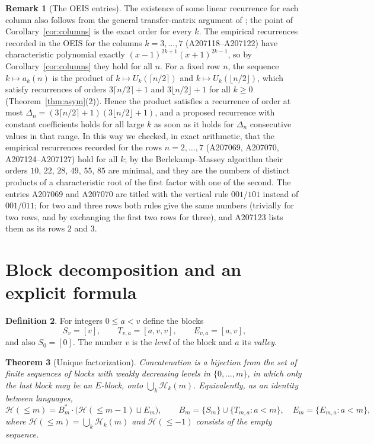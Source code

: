 \documentclass[11pt]{amsart}
\newtheorem{theorem}{Theorem}[section]
\theoremstyle{definition}
\newtheorem{definition}[theorem]{Definition}
\newtheorem{remark}[theorem]{Remark}
\begin{document}
\begin{remark}[The OEIS entries]\label{rem:oeis}
The existence of some linear recurrence for each column also follows from the general transfer-matrix argument of \cite[Theorem~2]{DBKTZ}; the point of Corollary~\ref{cor:columns} is the exact order for every $k$. The empirical recurrences recorded in the OEIS for the columns $k=3,\dots,7$ (A207118--A207122) have characteristic polynomial exactly $(x-1)^{2k+1}(x+1)^{2k-1}$, so by Corollary~\ref{cor:columns} they hold for all $n$. For a fixed row $n$, the sequence $k\mapsto a_k(n)$ is the product of $k\mapsto U_k(\lceil n/2\rceil)$ and $k\mapsto U_k(\lfloor n/2\rfloor)$, which satisfy recurrences of orders $3\lceil n/2\rceil+1$ and $3\lfloor n/2\rfloor+1$ for all $k\ge0$ (Theorem~\ref{thm:asym}(2)). Hence the product satisfies a recurrence of order at most $\Delta_n=(3\lceil n/2\rceil+1)(3\lfloor n/2\rfloor+1)$, and a proposed recurrence with constant coefficients holds for all large $k$ as soon as it holds for $\Delta_n$ consecutive values in that range. In this way we checked, in exact arithmetic, that the empirical recurrences recorded for the rows $n=2,\dots,7$ (A207069, A207070, A207124--A207127) hold for all $k$; by the Berlekamp--Massey algorithm their orders $10$, $22$, $28$, $49$, $55$, $85$ are minimal, and they are the numbers of distinct products of a characteristic root of the first factor with one of the second. The entries A207069 and A207070 are titled with the vertical rule $001$/$101$ instead of $001$/$011$; for two and three rows both rules give the same numbers (trivially for two rows, and by exchanging the first two rows for three), and A207123 lists them as its rows $2$ and $3$.
\end{remark}

\section{Block decomposition and an explicit formula}\label{sec:blocks}

\begin{definition}\label{def:blocks}
For integers $0\le a<v$ define the blocks
\[
  S_v=[v],\qquad T_{v,a}=[a,v,v],\qquad E_{v,a}=[a,v],
\]
and also $S_0=[0]$. The number $v$ is the \emph{level} of the block and $a$ its \emph{valley}.
\end{definition}

\begin{theorem}[Unique factorization]\label{thm:blocks}
Concatenation is a bijection from the set of finite sequences of blocks with weakly decreasing levels in $\{0,\dots,m\}$, in which only the last block may be an $E$-block, onto $\bigcup_k \mathcal H_k(m)$. Equivalently, as an identity between languages,
\[
  \mathcal H(\le m)=B_m^*\cdot\bigl(\mathcal H(\le m-1)\sqcup E_m\bigr),\qquad B_m=\{S_m\}\cup\{T_{m,a}:a<m\},\quad E_m=\{E_{m,a}:a<m\},
\]
where $\mathcal H(\le m)=\bigcup_k\mathcal H_k(m)$ and $\mathcal H(\le-1)$ consists of the empty sequence.
\end{theorem}
\end{document}
